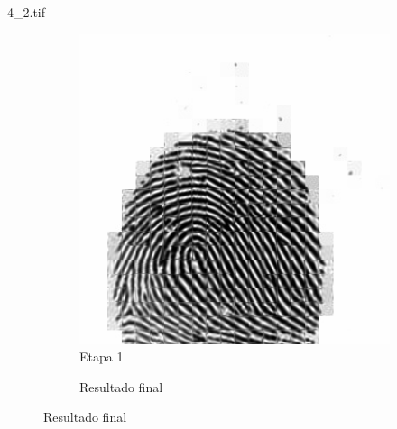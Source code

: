 \documentclass{beamer}
\begin{document}
\begin{frame}{4\_2.tif}
\begin{figure}
\begin{subfigure}[!ht]{0.32\textwidth}
                \includegraphics[width=\columnwidth]{Fingerprints/4_2_intermediate.jpg}
                \caption{Etapa 1}
            \end{subfigure}
            \begin{subfigure}[!ht]{0.32\textwidth}
                \caption{Resultado final}
            \end{subfigure}
        \end{figure}
    \end{frame}
\end{document}
